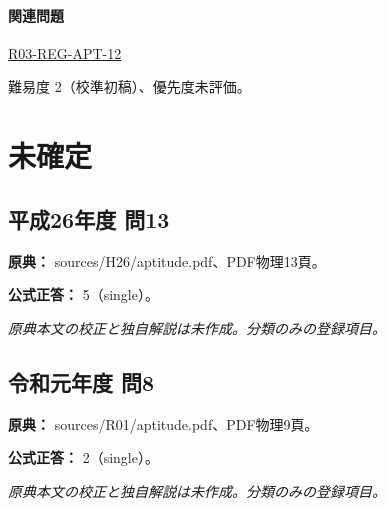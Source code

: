 \paragraph{関連問題} \hyperref[q:r03-reg-apt-12]{R03-REG-APT-12}

\par 難易度 2（校準初稿）、優先度未評価。

\section{未確定}

\subsection{平成26年度 問13}
\label{q:h26-reg-apt-13}

\noindent\textbf{原典：} sources/H26/aptitude.pdf、PDF物理13頁。

\textbf{公式正答：} 5（single）。

\par\textit{原典本文の校正と独自解説は未作成。分類のみの登録項目。}

\subsection{令和元年度 問8}
\label{q:r01-reg-apt-08}

\noindent\textbf{原典：} sources/R01/aptitude.pdf、PDF物理9頁。

\textbf{公式正答：} 2（single）。

\par\textit{原典本文の校正と独自解説は未作成。分類のみの登録項目。}
